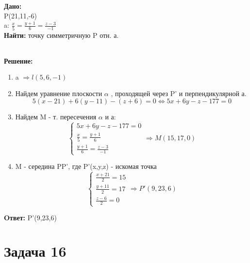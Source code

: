 \documentclass{article}
\begin{document}
\begin{minipage}[t]{0.45\textwidth}

\textbf{Дано:}\\ 
P(21,11,-6)\\ 
a: $ \frac{x}{5} = \frac{y+1}{6} = \frac{z-3}{-1}$\\ 
\textbf{Найти: }точку симметричную P отн. а. 
\end{minipage}
\begin{minipage}[t]{0.45\textwidth}
  \vspace{-\baselineskip} %

\begin{center}
\end{center}
\end{minipage}
\\
\textbf{Решение:}
\begin{enumerate}
  \item a $ \Rightarrow l(5,6,-1)  $
  \item Найдем уравнение плоскости $\alpha$ , проходящей через P' и перпендикулярной а. 
    \[
      5(x-21) + 6(y-11) -(z+6) = 0 \Leftrightarrow 5x+6y-z-177 =0 
    \]
    \item Найдем M - т. пересечения $ \alpha $ и а:
      \[
        \begin{cases}
5x+6y-z-177 =0 \\ 
\frac{x}{5} = \frac{y+1}{6} \\
\frac{y+1}{6} = \frac{z-3}{-1}
        \end{cases} 
      \Rightarrow M(15,17,0)\] 
\item M - середина PP', где P'(x,y,z) - искомая точка
  \[
    \begin{cases}  
    \frac{x+21}{2} = 15 \\ 
    \frac{y+11}{2} = 17 \\ 
    \frac{z-6}{2} = 0 
    \end{cases} \Rightarrow P'(9,23,6)
  \]
\end{enumerate}
\textbf{Oтвет: } P'(9,23,6) 

\section*{Задача 16}
\end{document}

